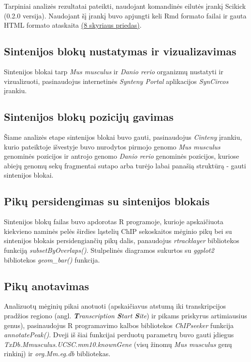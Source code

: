 \documentclass[12pt]{article}
\begin{document}
Tarpiniai analizės rezultatai pateikti, naudojant komandinės eilutės įrankį
Scikick\cite{SCIK} (0.2.0 versija). Naudojant šį įrankį buvo apjungti keli Rmd
formato failai ir gauta HTML formato ataskaita \hyperref[Priedas]{(8 skyriaus
priedas)}.

\subsection{Sintenijos blokų nustatymas ir vizualizavimas}
Sintenijos blokai tarp \emph{Mus musculus} ir \emph{Danio rerio} organizmų
nustatyti ir vizualizuoti, pasinaudojus internetinės
\emph{Synteny Portal}\cite{SYN_PORT} aplikacijos \emph{SynCircos} įrankiu.

\subsection{Sintenijos blokų pozicijų gavimas}
Šiame analizės etape sintenijos blokai buvo gauti, pasinaudojus \emph{Cinteny}
įrankiu, kurio pateiktoje išvestyje buvo nurodytos pirmojo genomo
\emph{Mus musculus} genominės pozicijos ir antrojo genomo \emph{Danio rerio}
genominės pozicijos, kuriose abiejų genomų sekų fragmentai sutapo arba turėjo
labai panašią struktūrą - gauti sintenijos blokai.

\subsection{Pikų persidengimas su sintenijos blokais}
Sintenijos blokų failas buvo apdorotas R programoje, kurioje apskaičiuota
kiekvieno naminės pelės širdies ląstelių ChIP sekoskaitos mėginio pikų bei su
sintenijos blokais persidengiančių pikų dalis, panaudojus
\emph{rtracklayer}\cite{R_TRACK} bibliotekos funkciją \emph{subsetByOverlaps()}.
Stulpelinės diagramos sukurtos su \emph{ggplot2}\cite{R_GGPLOT} bibliotekos
\emph{geom\_bar()} funkcija.

\subsection{Pikų anotavimas}
Analizuotų mėginių pikai anotuoti (apskaičiavus atstumą iki transkripcijos
pradžios regiono (angl. \emph{\textbf{T}ranscription \textbf{S}tart
\textbf{S}ite}) ir pikams priskyrus artimiausius genus), pasinaudojus R
programavimo kalbos bibliotekos \emph{ChIPseeker}\cite{CHIP} funkcija
\emph{annotatePeak()}. Dveji iš šiai funkcijai perduotų parametrų buvo gauti
įdiegus \emph{TxDb.Mmusculus.UCSC.mm10.knownGene}\cite{KNOWN_GENE} (visų žinomų
\emph{Mus musculus} genų rinkinį) ir \emph{org.Mm.eg.db}\cite{MM_ANNOT}
bibliotekas.
\end{document}

